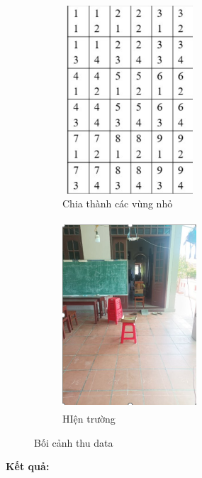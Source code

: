 \documentclass{article}
\begin{document}
\begin{figure}[H]
    \centering
    \begin{subfigure}[b]{0.45\textwidth}
        \centering
        \includegraphics[width=5cm,height=7cm]{image/anh14.png}
        \caption{Chia thành các vùng nhỏ} \label{EV1}
    \end{subfigure}
    \hfill
    \begin{subfigure}[b]{0.45\textwidth}
        \centering
        \includegraphics[width=5cm,height=7cm]{image/anh15.png}
        \caption{HIện trường} \label{EV2}
    \end{subfigure}
    \caption{Bối cảnh thu data}
    \label{fig:two_graphs}
\end{figure}
\textbf{Kết quả:}
\end{document}
